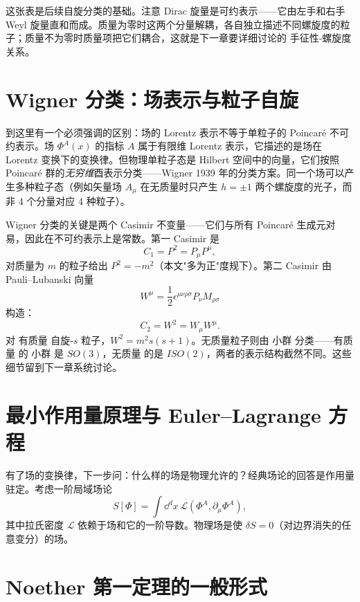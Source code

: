 这张表是后续自旋分类的基础。注意 Dirac 旋量是可约表示——它由左手和右手 Weyl 旋量直和而成。质量为零时这两个分量解耦，各自独立描述不同螺旋度的粒子；质量不为零时质量项把它们耦合，这就是下一章要详细讨论的 手征性-螺旋度 关系。

\section{Wigner 分类：场表示与粒子自旋}

到这里有一个必须强调的区别：场的 Lorentz 表示不等于单粒子的 Poincaré 不可约表示。场 $\Phi^A(x)$ 的指标 $A$ 属于有限维 Lorentz 表示，它描述的是场在 Lorentz 变换下的变换律。但物理单粒子态是 Hilbert 空间中的向量，它们按照 Poincaré 群的\emph{无穷维}酉表示分类——Wigner 1939 年的分类方案。同一个场可以产生多种粒子态（例如矢量场 $A_\mu$ 在无质量时只产生 $h=\pm1$ 两个螺旋度的光子，而非 4 个分量对应 4 种粒子）。

Wigner 分类的关键是两个 Casimir 不变量——它们与所有 Poincaré 生成元对易，因此在不可约表示上是常数。第一 Casimir 是
\begin{equation*}\boxed{C_1=P^2=P_\mu P^\mu,}
\end{equation*}
对质量为 $m$ 的粒子给出 $P^2=-m^2$（本文"多为正"度规下）。第二 Casimir 由 Pauli--Lubanski 向量
\begin{equation*}W^\mu=\frac{1}{2}\epsilon^{\mu\nu\rho\sigma}P_\nu M_{\rho\sigma}
\end{equation*}
构造：
\begin{equation*}\boxed{C_2=W^2=W_\mu W^\mu.}
\end{equation*}
对 有质量 自旋-$s$ 粒子，$W^2=m^2 s(s+1)$。无质量粒子则由 小群 分类——有质量 的 小群 是 $SO(3)$，无质量 的是 $ISO(2)$，两者的表示结构截然不同。这些细节留到下一章系统讨论。

\section{最小作用量原理与 Euler--Lagrange 方程}

有了场的变换律，下一步问：什么样的场是物理允许的？经典场论的回答是作用量驻定。考虑一阶局域场论
\begin{equation}
S[\Phi]=\int \dd^dx\,\mathcal{L}(\Phi^A,\partial_\mu\Phi^A),
\end{equation}
其中拉氏密度 $\mathcal{L}$ 依赖于场和它的一阶导数。物理场是使 $\delta S=0$（对边界消失的任意变分）的场。

\section{Noether 第一定理的一般形式}

